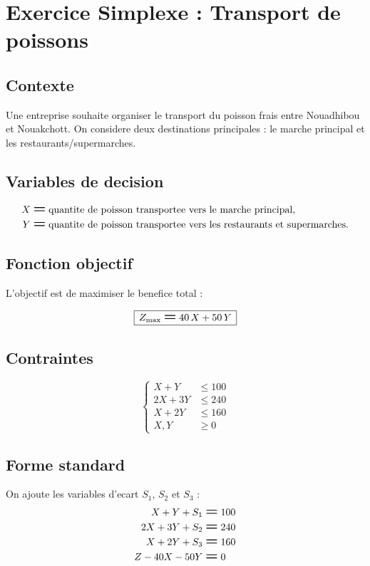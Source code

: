 \documentclass[12pt,a4paper]{article}
\newcommand{\Eq}{\mathrel{\text{\Large\bfseries =}}}
\newcommand{\Leq}{\leqslant}
\newcommand{\Geq}{\geqslant}
\newcommand{\BoxedEq}[1]{%
  \begin{equation*}
    \boxed{\,\displaystyle #1\,}
  \end{equation*}%
}
\begin{document}
\section*{Exercice Simplexe : Transport de poissons}

\subsection*{Contexte}
Une entreprise souhaite organiser le transport du poisson frais entre Nouadhibou et Nouakchott. On considere deux destinations principales : le marche principal et les restaurants/supermarches.

\subsection*{Variables de decision}
\[
\begin{aligned}
X &\Eq \text{quantite de poisson transportee vers le marche principal}, \\
Y &\Eq \text{quantite de poisson transportee vers les restaurants et supermarches}.
\end{aligned}
\]

\subsection*{Fonction objectif}
L'objectif est de maximiser le benefice total :

\BoxedEq{Z_{\mathrm{max}} \Eq 40\,X + 50\,Y}

\subsection*{Contraintes}
\[
\left\{
\begin{aligned}
X + Y    &\Leq 100 \\
2X + 3Y  &\Leq 240 \\
X + 2Y   &\Leq 160 \\
X, Y     &\Geq 0
\end{aligned}
\right.
\]

\subsection*{Forme standard}
On ajoute les variables d'ecart \(S_1\), \(S_2\) et \(S_3\) :
\[
\begin{aligned}
X + Y + S_1            &\Eq 100 \\
2X + 3Y + S_2          &\Eq 240 \\
X + 2Y + S_3           &\Eq 160 \\
Z - 40X - 50Y          &\Eq 0
\end{aligned}
\]
\end{document}
